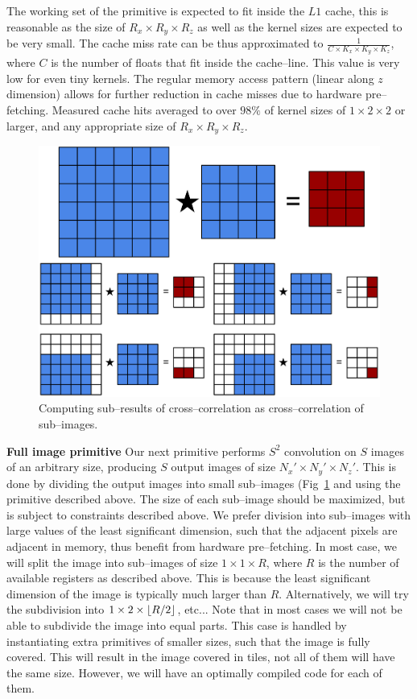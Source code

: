   The working set of the primitive is expected to fit inside the $L1$
  cache, this is reasonable as the size of $R_x \times R_y \times R_z$
  as well as the kernel sizes are expected to be very small.  The
  cache miss rate can be thus approximated to $\frac{1}{C \times K_x
    \times K_y \times K_z}$, where $C$ is the number of floats that
  fit inside the cache--line.  This value is very low for even tiny
  kernels.  The regular memory access pattern (linear along $z$
  dimension) allows for further reduction in cache misses due to
  hardware pre--fetching.  Measured cache hits averaged to over $98\%$
  of kernel sizes of $1 \times 2 \times 2$ or larger, and any
  appropriate size of $R_x \times R_y \times R_z$.

  \begin{figure}
    \begin{center}
      \includegraphics[width=0.57\linewidth]{fig/division}
    \end{center}
    \caption{Computing sub--results of cross--correlation as
      cross--correlation of sub--images.}
    \label{fig:conv-division}
  \end{figure}

  {\bf Full image primitive} \quad Our next primitive performs $S^2$
  convolution on $S$ images of an arbitrary size, producing $S$ output
  images of size $N_x' \times N_y' \times N_z'$.  This is done by
  dividing the output images into small sub--images
  (Fig~\ref{fig:conv-division} and using the primitive described
  above.  The size of each sub--image should be maximized, but is
  subject to constraints described above.  We prefer division into
  sub--images with large values of the least significant dimension,
  such that the adjacent pixels are adjacent in memory, thus benefit
  from hardware pre--fetching.  In most case, we will split the image
  into sub--images of size $1 \times 1 \times R$, where $R$ is the
  number of available registers as described above.  This is because
  the least significant dimension of the image is typically much
  larger than $R$.  Alternatively, we will try the subdivision into $1
  \times 2 \times \lfloor R/2\rfloor$, etc...  Note that in most cases we
  will not be able to subdivide the image into equal parts.  This case
  is handled by instantiating extra primitives of smaller sizes, such
  that the image is fully covered.  This will result in the image
  covered in tiles, not all of them will have the same size.  However,
  we will have an optimally compiled code for each of them.

